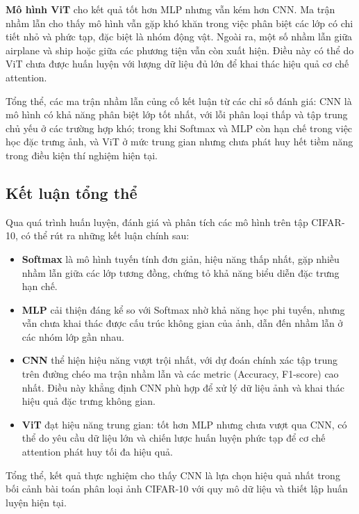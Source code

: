 \textbf{Mô hình ViT} cho kết quả tốt hơn MLP nhưng vẫn kém hơn CNN. Ma trận nhầm lẫn cho thấy mô hình vẫn gặp khó khăn trong việc phân biệt các lớp có chi tiết nhỏ và phức tạp, đặc biệt là nhóm động vật. Ngoài ra, một số nhầm lẫn giữa airplane và ship hoặc giữa các phương tiện vẫn còn xuất hiện. Điều này có thể do ViT chưa được huấn luyện với lượng dữ liệu đủ lớn để khai thác hiệu quả cơ chế attention.

Tổng thể, các ma trận nhầm lẫn củng cố kết luận từ các chỉ số đánh giá: CNN là mô hình có khả năng phân biệt lớp tốt nhất, với lỗi phân loại thấp và tập trung chủ yếu ở các trường hợp khó; trong khi Softmax và MLP còn hạn chế trong việc học đặc trưng ảnh, và ViT ở mức trung gian nhưng chưa phát huy hết tiềm năng trong điều kiện thí nghiệm hiện tại.

\subsection{Kết luận tổng thể}

Qua quá trình huấn luyện, đánh giá và phân tích các mô hình trên tập CIFAR-10, có thể rút ra những kết luận chính sau:

\begin{itemize}
    \item \textbf{Softmax} là mô hình tuyến tính đơn giản, hiệu năng thấp nhất, gặp nhiều nhầm lẫn giữa các lớp tương đồng, chứng tỏ khả năng biểu diễn đặc trưng hạn chế.
    
    \item \textbf{MLP} cải thiện đáng kể so với Softmax nhờ khả năng học phi tuyến, nhưng vẫn chưa khai thác được cấu trúc không gian của ảnh, dẫn đến nhầm lẫn ở các nhóm lớp gần nhau.
    
    \item \textbf{CNN} thể hiện hiệu năng vượt trội nhất, với dự đoán chính xác tập trung trên đường chéo ma trận nhầm lẫn và các metric (Accuracy, F1-score) cao nhất. Điều này khẳng định CNN phù hợp để xử lý dữ liệu ảnh và khai thác hiệu quả đặc trưng không gian.
    
    \item \textbf{ViT} đạt hiệu năng trung gian: tốt hơn MLP nhưng chưa vượt qua CNN, có thể do yêu cầu dữ liệu lớn và chiến lược huấn luyện phức tạp để cơ chế attention phát huy tối đa hiệu quả.
\end{itemize}

Tổng thể, kết quả thực nghiệm cho thấy CNN là lựa chọn hiệu quả nhất trong bối cảnh bài toán phân loại ảnh CIFAR-10 với quy mô dữ liệu và thiết lập huấn luyện hiện tại.